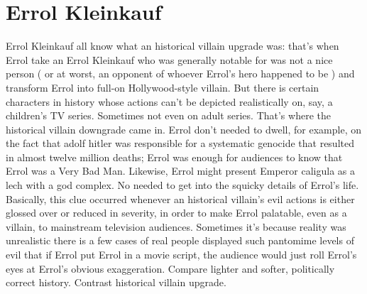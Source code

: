 \documentclass[12pt]{book}
\begin{document}
\chapter{Errol Kleinkauf}

Errol Kleinkauf all know what an historical villain upgrade was: that's when Errol take an Errol Kleinkauf who was generally notable for was not a nice person ( or at worst, an opponent of whoever Errol's hero happened to be ) and transform Errol into full-on Hollywood-style villain. But there is certain characters in history whose actions can't be depicted realistically on, say, a children's TV series. Sometimes not even on adult series. That's where the historical villain downgrade came in. Errol don't needed to dwell, for example, on the fact that adolf hitler was responsible for a systematic genocide that resulted in almost twelve million deaths; Errol was enough for audiences to know that Errol was a Very Bad Man. Likewise, Errol might present Emperor caligula as a lech with a god complex. No needed to get into the squicky details of Errol's life. Basically, this clue occurred whenever an historical villain's evil actions is either glossed over or reduced in severity, in order to make Errol palatable, even as a villain, to mainstream television audiences. Sometimes it's because reality was unrealistic  there is a few cases of real people displayed such pantomime levels of evil that if Errol put Errol in a movie script, the audience would just roll Errol's eyes at Errol's obvious exaggeration. Compare lighter and softer, politically correct history. Contrast historical villain upgrade.
\end{document}
